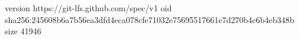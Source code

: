 version https://git-lfs.github.com/spec/v1
oid sha256:245608b6a7b56ea3dfd4eca078cfe71032e75695517661e7d270b4c6b4eb348b
size 41946
